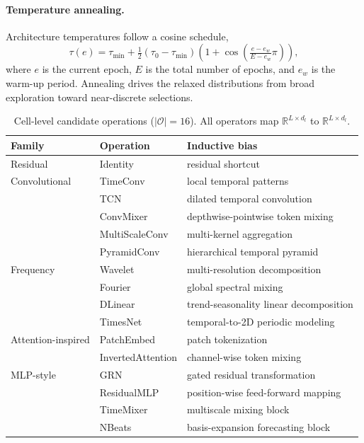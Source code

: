 \paragraph{Temperature annealing.}
Architecture temperatures follow a cosine schedule,
%
\begin{equation}
    \tau(e) = \tau_{\min} + \tfrac{1}{2}(\tau_0 - \tau_{\min})
      \left(1 + \cos\!\left(\tfrac{e - e_w}{E - e_w}\pi\right)\right),
    \label{eq:temp}
\end{equation}
%
where $e$ is the current epoch, $E$ is the total number of epochs, and $e_w$
is the warm-up period. Annealing drives the relaxed distributions from broad
exploration toward near-discrete selections.

\begin{table}[h]
\centering
\caption{Cell-level candidate operations ($|\mathcal{O}|=16$). All operators
         map $\mathbb{R}^{L \times d_l}$ to $\mathbb{R}^{L \times d_l}$.}
\label{tab:ops}
\small
\begin{tabular}{lll}
\toprule
Family & Operation & Inductive bias \\
\midrule
Residual
  & Identity & residual shortcut \\
\addlinespace
Convolutional
  & TimeConv & local temporal patterns \\
  & TCN & dilated temporal convolution \\
  & ConvMixer & depthwise-pointwise token mixing \\
  & MultiScaleConv & multi-kernel aggregation \\
  & PyramidConv & hierarchical temporal pyramid \\
\addlinespace
Frequency
  & Wavelet & multi-resolution decomposition \\
  & Fourier & global spectral mixing \\
  & DLinear & trend-seasonality linear decomposition \\
  & TimesNet & temporal-to-2D periodic modeling \\
\addlinespace
Attention-inspired
  & PatchEmbed & patch tokenization \\
  & InvertedAttention & channel-wise token mixing \\
\addlinespace
MLP-style
  & GRN & gated residual transformation \\
  & ResidualMLP & position-wise feed-forward mapping \\
  & TimeMixer & multiscale mixing block \\
  & NBeats & basis-expansion forecasting block \\
\bottomrule
\end{tabular}
\end{table}

